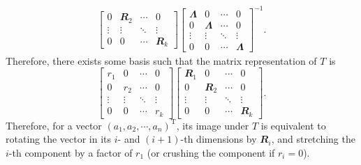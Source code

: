 \documentclass[math, code]{amznotes}
\theoremstyle{remark}
\begin{document}
\begin{align*}
\begin{bmatrix}
        0 & \mathbfit{R}_2 & \cdots & 0 \\
        \vdots & \vdots & \ddots & \vdots \\
        0 & 0 & \cdots & \mathbfit{R}_k
    \end{bmatrix}\begin{bmatrix}
        \mathbfit{\Lambda} & 0 & \cdots & 0 \\
        0 & \mathbfit{\Lambda} & \cdots & 0 \\  
        \vdots & \vdots & \ddots & \vdots \\
        0 & 0 & \cdots & \mathbfit{\Lambda}
    \end{bmatrix}^{-1}.
\end{align*}
Therefore, there exists some basis such that the matrix representation of $T$ is 
\begin{equation*}
    \begin{bmatrix}
        r_1 & 0 & \cdots & 0 \\
        0 & r_2 & \cdots & 0 \\
        \vdots & \vdots & \ddots & \vdots \\
        0 & 0 & \cdots & r_k
    \end{bmatrix}\begin{bmatrix}
        \mathbfit{R}_1 & 0 & \cdots & 0 \\
        0 & \mathbfit{R}_2 & \cdots & 0 \\
        \vdots & \vdots & \ddots & \vdots \\
        0 & 0 & \cdots & \mathbfit{R}_k
    \end{bmatrix}.
\end{equation*}
Therefore, for a vector $(a_1, a_2, \cdots, a_n)^{\mathrm{T}}$, its image under $T$ is equivalent to rotating the vector in its $i$- and $(i + 1)$-th dimensions by $\mathbfit{R}_i$, and stretching the $i$-th component by a factor of $r_1$ (or crushing the component if $r_i = 0$).
\end{document}
